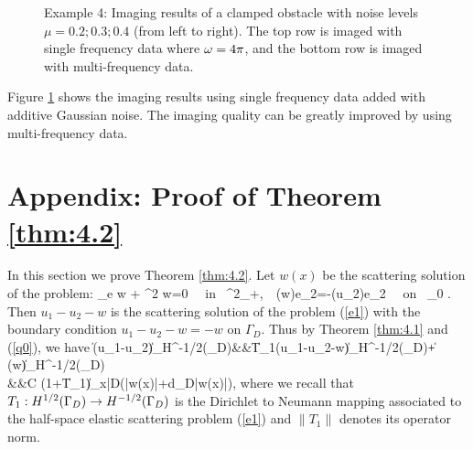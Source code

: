 \documentclass[12pt]{iopart}
\begin{document}
{\begin{figure}
	\caption{Example 4: Imaging results of a clamped obstacle with noise levels $\mu =  0.2; 0.3; 0.4$ (from left to
		right). The top row is imaged with single frequency data where $\omega=4\pi$, and the
		bottom row is imaged with multi-frequency data.}\label{figure_4}
\end{figure}

Figure \ref{figure_4} shows the imaging results using single frequency data added with additive
Gaussian noise. The imaging quality can be greatly improved by using multi-frequency data.

\section{Appendix: Proof of Theorem \ref{thm:4.2}}

In this section we prove Theorem \ref{thm:4.2}.
Let $w(x)$ be the scattering solution of the problem:
\be\label{f2}
\Delta_e w + \omega^2 w=0 \ \ \mbox{\rm in } \R^2_+,\ \ 
\sigma(w)e_2=-\sigma(u_2)e_2 \ \ \mbox{\rm on } \Ga_0 .
\ee
Then $u_1-u_2-w$ is the scattering solution of the problem (\ref{e1}) with the boundary condition $u_1-u_2-w=-w$ on $\Gamma_D$. Thus by Theorem \ref{thm:4.1} and (\ref{q0}), we have
\be
\hskip-1cm\|\sigma(u_1-u_2)\nu\|_{H^{-1/2}(\Gamma_D)}&\leq&\|T_1(u_1-u_2-w)\|_{H^{-1/2}(\Gamma_D)}+\|\sigma(w)\nu\|_{H^{-1/2}(\Gamma_D)}\nn\\
&\leq&C (1+\|T_1\|)\max_{x\in \bar D}(|w(x)|+d_D|\nabla w(x)|),\label{f5}
\ee
where we recall that $T_1:H^{1/2}(\Gamma_D)\to H^{-1/2}(\Gamma_D)$ is the Dirichlet to Neumann mapping associated to the half-space elastic scattering problem (\ref{e1}) and $\|T_1\|$ denotes its operator norm.

}
\end{document}
